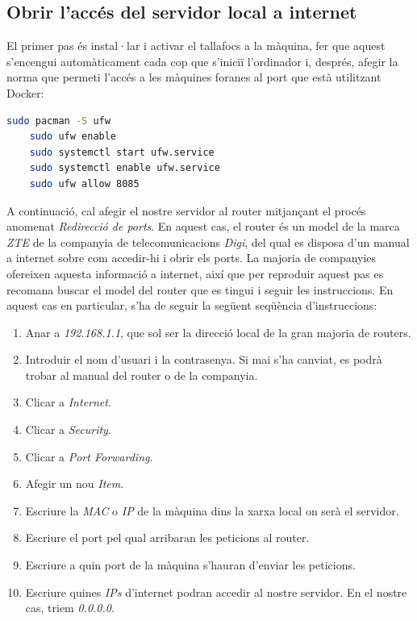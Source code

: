 \subsection{Obrir l'accés del servidor local a internet}

El primer pas és instal·lar i activar el tallafocs a la màquina, fer que aquest s'encengui automàticament cada cop que s'iniciï l'ordinador i, després, afegir la norma que permeti l'accés a les màquines foranes al port que està utilitzant Docker:

\begin{lstlisting}[language=bash, caption=Instalació del tallafocs al servidor local]
    sudo pacman -S ufw
    sudo ufw enable
    sudo systemctl start ufw.service
    sudo systemctl enable ufw.service
    sudo ufw allow 8085
\end{lstlisting}

A continuació, cal afegir el nostre servidor al router mitjançant el procés anomenat \textit{Redirecció de ports}. En aquest cas, el router és un model de la marca \textit{ZTE} de la companyia de telecomunicacions \textit{Digi}, del qual es disposa d'un manual a internet sobre com accedir-hi i obrir els ports. La majoria de companyies ofereixen aquesta informació a internet, així que per reproduir aquest pas es recomana buscar el model del router que es tingui i seguir les instruccions. En aquest cas en particular, s'ha de seguir la següent seqüència d'instruccions:

\label{subsec:PortForwardingLocal}

\begin{enumerate} \item Anar a \textit{192.168.1.1}, que sol ser la direcció local de la gran majoria de routers. \item Introduir el nom d'usuari i la contrasenya. Si mai s'ha canviat, es podrà trobar al manual del router o de la companyia. \item Clicar a \textit{Internet}. \item Clicar a \textit{Security}. \item Clicar a \textit{Port Forwarding}. \item Afegir un nou \textit{Item}. \item Escriure la \textit{MAC} o \textit{IP} de la màquina dins la xarxa local on serà el servidor. \item Escriure el port pel qual arribaran les peticions al router. \item Escriure a quin port de la màquina s'hauran d'enviar les peticions. \item Escriure quines \textit{IPs} d'internet podran accedir al nostre servidor. En el nostre cas, triem \textit{0.0.0.0}. \end{enumerate}

